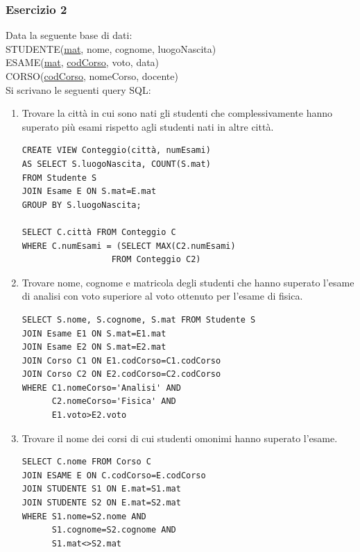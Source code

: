 \documentclass[a4paper]{article}
\begin{document}
\subsubsection{Esercizio 2}
Data la seguente base di dati:\medskip\\
STUDENTE(\underline{mat}, nome, cognome, luogoNascita)\\
ESAME(\underline{mat}, \underline{codCorso}, voto, data)\\
CORSO(\underline{codCorso}, nomeCorso, docente)\medskip\\
Si scrivano le seguenti query SQL:
\begin{enumerate}[leftmargin=*]
\item Trovare la città in cui sono nati gli studenti che complessivamente hanno superato più esami rispetto agli studenti nati in altre città.
\begin{verbatim}
CREATE VIEW Conteggio(città, numEsami)
AS SELECT S.luogoNascita, COUNT(S.mat)
FROM Studente S
JOIN Esame E ON S.mat=E.mat
GROUP BY S.luogoNascita;

SELECT C.città FROM Conteggio C
WHERE C.numEsami = (SELECT MAX(C2.numEsami)
                  FROM Conteggio C2)
\end{verbatim}
\item Trovare nome, cognome e matricola degli studenti che hanno superato l'esame di analisi con voto superiore al voto ottenuto per l'esame di fisica.
\begin{verbatim}
SELECT S.nome, S.cognome, S.mat FROM Studente S
JOIN Esame E1 ON S.mat=E1.mat
JOIN Esame E2 ON S.mat=E2.mat
JOIN Corso C1 ON E1.codCorso=C1.codCorso
JOIN Corso C2 ON E2.codCorso=C2.codCorso
WHERE C1.nomeCorso='Analisi' AND
      C2.nomeCorso='Fisica' AND
      E1.voto>E2.voto
\end{verbatim}
\item Trovare il nome dei corsi di cui studenti omonimi hanno superato l'esame.
\begin{verbatim}
SELECT C.nome FROM Corso C
JOIN ESAME E ON C.codCorso=E.codCorso
JOIN STUDENTE S1 ON E.mat=S1.mat
JOIN STUDENTE S2 ON E.mat=S2.mat
WHERE S1.nome=S2.nome AND
      S1.cognome=S2.cognome AND
      S1.mat<>S2.mat
\end{verbatim}
\end{enumerate}
\end{document}

